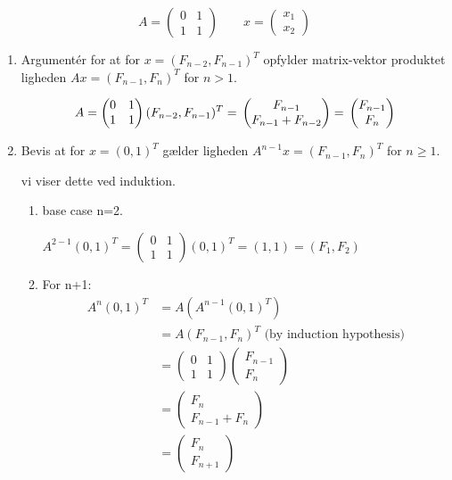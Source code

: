 \documentclass{article}
\theoremstyle{definition}
\begin{document}
\[
A = \begin{pmatrix} 0 & 1 \\ 1 & 1 \end{pmatrix} \qquad
x = \begin{pmatrix} x_1 \\ x_2 \end{pmatrix}
\]

\begin{enumerate}
    \item Argumentér for at for $x = (F_{n-2}, F_{n-1})^T$ opfylder matrix-vektor produktet ligheden $Ax = (F_{n-1}, F_n)^T$ for $n > 1$.
    
    \[
    A = \begin{pmatrix} 0 & 1 \\ 1 & 1 \end{pmatrix} (F_{n-2}, F_{n-1})^T \\ = 
    \\ \begin{pmatrix} F_{n-1} \\ F_{n-1}+F_{n-2} \end{pmatrix} = \\
    \begin{pmatrix} F_{n-1} \\ F_{n} \end{pmatrix} 
    \]
    
    \item Bevis at for $x = (0,1)^T$ gælder ligheden $A^{n-1}x = (F_{n-1}, F_n)^T$ for $n \geq 1$. 
    
    vi viser dette ved induktion.

    \begin{enumerate}
        \item base case n=2. 
        
        $A^{2-1}(0,1)^T = \begin{pmatrix} 0 & 1 \\ 1 & 1 \end{pmatrix}(0,1)^T = (1, 1) = (F_{1}, F_2) $

        \item For n+1:
        \begin{align*}
        A^{n}(0,1)^T &= A(A^{n-1}(0,1)^T) \\
        &= A(F_{n-1}, F_n)^T \text{ (by induction hypothesis)} \\
        &= \begin{pmatrix} 0 & 1 \\ 1 & 1 \end{pmatrix} \begin{pmatrix} F_{n-1} \\ F_n \end{pmatrix} \\
        &= \begin{pmatrix} F_n \\ F_{n-1} + F_n \end{pmatrix} \\
        &= \begin{pmatrix} F_n \\ F_{n+1} \end{pmatrix}
        \end{align*}


\end{enumerate}
\end{enumerate}
\end{document}
